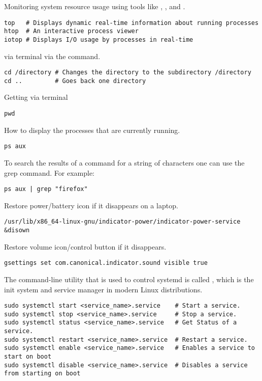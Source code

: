 Monitoring system resource usage using tools like , , and .
\begin{lstlisting}
top   # Displays dynamic real-time information about running processes
htop  # An interactive process viewer
iotop # Displays I/O usage by processes in real-time
\end{lstlisting}

 via terminal via the command.
\begin{lstlisting}
cd /directory # Changes the directory to the subdirectory /directory
cd ..         # Goes back one directory
\end{lstlisting}

Getting  via terminal
\begin{lstlisting}
pwd
\end{lstlisting}

How to display the processes that are currently running.
\begin{lstlisting}
ps aux
\end{lstlisting}

To search the results of a command for a string of characters one can use the grep command. For example:
\begin{lstlisting}
ps aux | grep "firefox"
\end{lstlisting}

Restore power/battery icon if it disappears on a laptop.
\begin{lstlisting}
/usr/lib/x86_64-linux-gnu/indicator-power/indicator-power-service &disown 
\end{lstlisting}

Restore volume icon/control button if it disappears.
\begin{lstlisting}
gsettings set com.canonical.indicator.sound visible true
\end{lstlisting}

The command-line utility that is used to control systemd is called , which is the init system and service manager in modern Linux distributions.
\begin{lstlisting}
sudo systemctl start <service_name>.service    # Start a service.
sudo systemctl stop <service_name>.service     # Stop a service.
sudo systemctl status <service_name>.service   # Get Status of a service.
sudo systemctl restart <service_name>.service  # Restart a service.
sudo systemctl enable <service_name>.service   # Enables a service to start on boot
sudo systemctl disable <service_name>.service  # Disables a service from starting on boot
\end{lstlisting}

